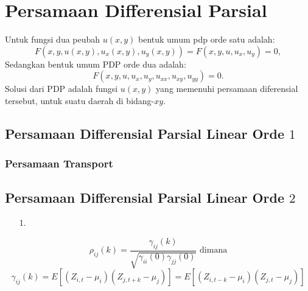 \documentclass[11pt,a4paper]{article}
\theoremstyle{plain}
\theoremstyle{definition}
\theoremstyle{remark}
\begin{document}
\section{Persamaan Differensial Parsial}
Untuk fungsi dua peubah $u(x,y)$ bentuk umum pdp orde satu adalah:
$$ F(x,y,u(x,y),u_{x}(x,y),u_{y}(x,y))=F(x,y,u,u_x,u_y)=0,$$
Sedangkan bentuk umum PDP orde dua adalah:
$$F(x,y,u,u_{x},u_{y},u_{xx},u_{xy},u_{yy})=0.$$
Solusi dari PDP adalah fungsi $u(x,y)$ yang memenuhi persamaan diferensial tersebut, untuk suatu daerah di bidang-$xy$. 
\subsection{Persamaan Differensial Parsial Linear Orde $1$}
\subsubsection{Persamaan Transport}
\subsection{Persamaan Differensial Parsial Linear Orde $2$}


\begin{enumerate}
	\item[1.]
	
\end{enumerate}





	

$$\rho_{ij}(k)=\frac{\gamma_{ij}(k)}{\sqrt{\gamma_{ii}(0)\gamma_{jj}(0)}} \text{ dimana}$$
$$\gamma_{ij}(k) = E\left [ \left (  Z_{i,t}-\mu_{i}\right )\left ( Z_{j,t+k}-\mu_{j} \right ) \right ] = E\left [ \left (  Z_{i,t-k}-\mu_{i}\right )\left ( Z_{j,t}-\mu_{j} \right ) \right ]$$
\end{document}
